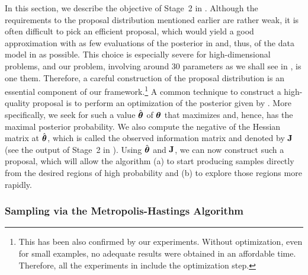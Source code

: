 In this section, we describe the objective of Stage~2 in .
Although the requirements to the proposal distribution mentioned earlier are
rather weak, it is often difficult to pick an efficient proposal, which would
yield a good approximation with as few evaluations of the posterior in
 and, thus, of the data model in  as possible.
This choice is especially severe for high-dimensional problems, and our problem,
involving around 30 parameters as we shall see in ,
is one them. Therefore, a careful construction of the proposal distribution is
an essential component of our framework.\footnote{This has been also confirmed
by our experiments. Without optimization, even for small examples, no adequate
results were obtained in an affordable time. Therefore, all the experiments in
 include the optimization step.} A common technique
to construct a high-quality proposal is to perform an optimization of the
posterior given by . More specifically, we seek for such a value
$\hat{\boldsymbol{\theta}}$ of $\boldsymbol{\theta}$ that maximizes  and, hence, has the maximal
posterior probability. We also compute the negative of the Hessian matrix at
$\hat{\boldsymbol{\theta}}$, which is called the observed information matrix and denoted by
$\mathbf{J}$ (see the output of Stage~2 in ). Using $\hat{\boldsymbol{\theta}}$ and
$\mathbf{J}$, we can now construct such a proposal, which will allow the 
algorithm (a) to start producing samples directly from the desired regions of
high probability and (b) to explore those regions more rapidly.

\subsubsection{Sampling via the Metropolis-Hastings Algorithm}

